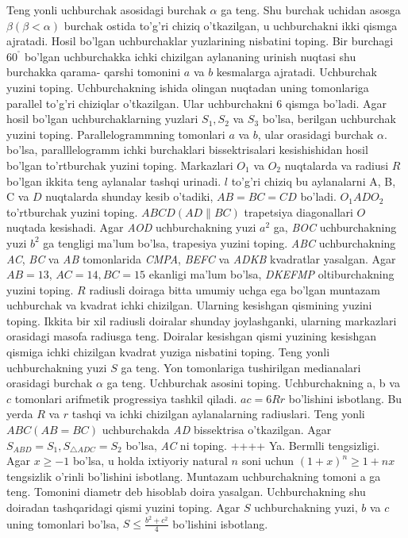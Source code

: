 Teng yonli uchburchak asosidagi burchak \(\alpha\) ga teng. Shu burchak uchidan asosga \(\beta(\beta < \alpha)\) burchak ostida to'g'ri chiziq o'tkazilgan, u uchburchakni ikki qismga ajratadi. Hosil bo'lgan uchburchaklar yuzlarining nisbatini toping.
Bir burchagi \(60^{{^\circ}}\) bo'lgan uchburchakka ichki chizilgan aylananing urinish nuqtasi shu burchakka qarama- qarshi tomonini \(a\) va \(b\) kesmalarga ajratadi. Uchburchak yuzini toping.
Uchburchakning ishida olingan nuqtadan uning tomonlariga parallel to'g'ri chiziqlar o'tkazilgan. Ular uchburchakni 6 qismga bo'ladi. Agar hosil bo'lgan uchburchaklarning yuzlari \(S_{1},S_{2}\) va \(S_{3}\) bo'lsa, berilgan uchburchak yuzini toping.
Parallelogrammning tomonlari \(a\) va \(b\), ular orasidagi burchak \(\alpha\). bo'lsa, paralllelogramm ichki burchaklari bissektrisalari kesishishidan hosil bo'lgan to'rtburchak yuzini toping.
Markazlari \(O_{1}\) va \(O_{2}\) nuqtalarda va radiusi \(R\) bo'lgan ikkita teng aylanalar tashqi urinadi. \(l\) to'g'ri chiziq bu aylanalarni A, B, C va \(D\) nuqtalarda shunday kesib o'tadiki, \(AB = BC = CD\) bo'ladi. \(O_{1}ADO_{2}\) to'rtburchak yuzini toping.
\(ABCD(AD\| BC)\) trapetsiya diagonallari \(O\) nuqtada kesishadi. Agar \emph{AOD} uchburchakning yuzi \(a^{2}\) ga, \emph{BOC} uchburchakning yuzi \(b^{2}\) ga tengligi ma'lum bo'lsa, trapesiya yuzini toping.
\emph{ABC} uchburchakning \emph{AC}, \emph{BC} va \emph{AB} tomonlarida \emph{CMPA}, \emph{BEFC} va \emph{ADKB} kvadratlar yasalgan. Agar \(AB = 13\), \(AC = 14,BC = 15\) ekanligi ma'lum bo'lsa, \emph{DKEFMP} oltiburchakning yuzini toping.
\(R\) radiusli doiraga bitta umumiy uchga ega bo'lgan muntazam uchburchak va kvadrat ichki chizilgan. Ularning kesishgan qismining yuzini toping.
Ikkita bir xil radiusli doiralar shunday joylashganki, ularning markazlari orasidagi masofa radiusga teng. Doiralar kesishgan qismi yuzining kesishgan qismiga ichki chizilgan kvadrat yuziga nisbatini toping.
Teng yonli uchburchakning yuzi \(S\) ga teng. Yon tomonlariga tushirilgan medianalari orasidagi burchak \(\alpha\) ga teng. Uchburchak asosini toping.
Uchburchakning a, b va \(c\) tomonlari arifmetik progressiya tashkil qiladi. \(ac = 6Rr\) bo'lishini isbotlang. Bu yerda \(R\) va \(r\) tashqi va ichki chizilgan aylanalarning radiuslari.
Teng yonli \(ABC(AB = BC)\) uchburchakda \emph{AD} bissektrisa o'tkazilgan. Agar \(S_{ABD} = S_{1},S_{\bigtriangleup ADC} = S_{2}\) bo'lsa, \emph{AC} ni toping.
++++
Ya. Bermlli tengsizligi. Agar \(x \geq - 1\) bo'lsa, u holda ixtiyoriy natural \(n\) soni uchun \((1 + x)^{n} \geq 1 + nx\) tengsizlik o'rinli bo'lishini isbotlang.
Muntazam uchburchakning tomoni a ga teng. Tomonini diametr deb hisoblab doira yasalgan. Uchburchakning shu doiradan tashqaridagi qismi yuzini toping.
Agar \(S\) uchburchakning yuzi, \(b\) va \(c\) uning tomonlari bo'lsa, \(S \leq \frac{b^{2} + c^{2}}{4}\) bo'lishini isbotlang.